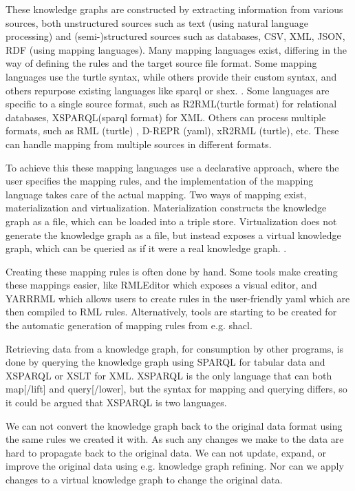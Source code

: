 These knowledge graphs are constructed by extracting information from various sources, both unstructured sources such as text (using natural language processing) and (semi-)structured sources such as databases, CSV, XML, JSON, RDF (using mapping languages). Many mapping languages exist, differing in the way of defining the rules and the target source file format. Some mapping languages use the turtle syntax, while others provide their custom syntax, and others repurpose existing languages like \acrshort{sparql} or \acrshort{shex}. \citep{VANASSCHE2023100753}. Some languages are specific to a single source format, such as R2RML(turtle format) \citep{Das:12:RRR} for relational databases, XSPARQL(\acrshort{sparql} format) \citep{Bischof2012} for XML. Others can process multiple formats, such as RML (turtle) \citep{dimou_ldow_2014}, D-REPR (\acrshort{yaml}), xR2RML (turtle), etc. These can handle mapping from multiple sources in different formats.

To achieve this these mapping languages use a declarative approach, where the user specifies the mapping rules, and the implementation of the mapping language takes care of the actual mapping. Two ways of mapping exist, materialization and virtualization. Materialization constructs the knowledge graph as a file, which can be loaded into a triple store. Virtualization does not generate the knowledge graph as a file, but instead exposes a virtual knowledge graph, which can be queried as if it were a real knowledge graph. \citep{ontop}.

Creating these mapping rules is often done by hand. Some tools make creating these mappings easier, like RMLEditor \citep{heyvaert_jws_2018} which exposes a visual editor, and YARRRML \citep{10.1007/978-3-319-98192-5_40} which allows users to create rules in the user-friendly \acrshort{yaml} which are then compiled to RML rules. Alternatively, tools are starting to be created for the automatic generation of mapping rules from e.g. \acrshort{shacl}.

Retrieving data from a knowledge graph, for consumption by other programs, is done by querying the knowledge graph using SPARQL \citep{Seaborne:08:SQL} for tabular data and XSPARQL \citep{Bischof2012} or XSLT for XML. XSPARQL is the only language that can both map[/lift] and query[/lower], but the syntax for mapping and querying differs, so it could be argued that XSPARQL is two languages.

We can not convert the knowledge graph back to the original data format using the same rules we created it with. As such any changes we make to the data are hard to propagate back to the original data. We can not update, expand, or improve the original data using e.g. knowledge graph refining. Nor can we apply changes to a virtual knowledge graph to change the original data. 

